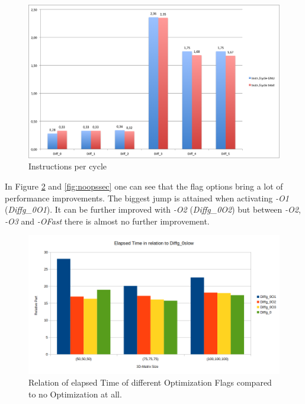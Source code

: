 \documentclass[12pt,a4paper]{article}
\begin{document}
\begin{figure}
	\centering
	\includegraphics[width=1.0\linewidth]{"Benchmark/Instrcycle"}
	\caption{Instructions per cycle}
	\label{fig:instrcycle}
\end{figure}

In Figure \ref{fig:Ocompelapsedtime} and \ref{fig:noopssec} one can see that the flag options bring a lot of performance improvements. The biggest jump is attained when activating \emph{-O1} (\emph{Diffg\_0O1}). It can be further improved with \emph{-O2} (\emph{Diffg\_0O2}) but between \emph{-O2}, \emph{-O3} and \emph{-OFast} there is almost no further improvement. 

\begin{figure}
	\centering
	\includegraphics[width=1.0\linewidth]{"Benchmark 3/elapsedtimepercOcomp"}
	\caption{Relation of elapsed Time of different Optimization Flags compared to no Optimization at all.}
	\label{fig:Ocompelapsedtime}
\end{figure}
\end{document}
